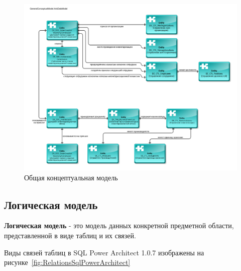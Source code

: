 \begin{figure}[!h]
    \centering

    \includegraphics[width=16cm]
    {assets/ARIS/DataModel/GeneralConceptualModel/GeneralConceptualModel.ArisDataModel.pdf}

    \caption{Общая концептуальная модель}

    \label{fig:GeneralConceptualModel}
\end{figure}


\newpage
\subsection{Логическая модель}

\textbf{Логическая модель} - это модель данных конкретной предметной области,
представленной в виде таблиц и их связей.

Виды связей таблиц в SQL Power Architect 1.0.7 \cite{SqlPowerArhitect}
изображены на рисунке~\ref{fig:RelationsSqlPowerArchitect}

